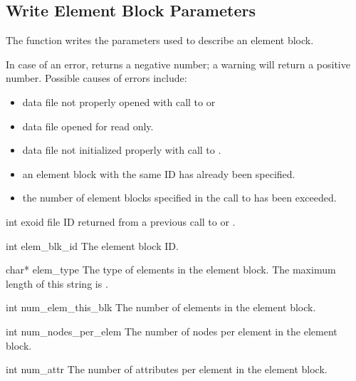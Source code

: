 \subsection{Write Element Block Parameters}\label{s:pebparam}

The function  writes the parameters used
to describe an element block.

In case of an error,  returns a negative
number; a warning will return a positive number. Possible causes of
errors include:

\begin{itemize}
 \item data file not properly opened with call to 
 or 

 \item data file opened for read only.

 \item data file not initialized properly with call to
 .

 \item an element block with the same ID has already been specified.

 \item the number of element blocks specified in the call to
  has been exceeded.
\end{itemize}


\begin{parameters}
\item[{int exoid \R{}}]
\exo{} file ID returned from a previous call to  
or .

\item[{int elem_blk_id \R{}}]
The element block ID.

\item[{char* elem_type \R{}}]
The type of elements in the element block. The maximum length of this
string is .

\item[{int num_elem_this_blk \R{}}]
The number of elements in the element block.

\item[{int num_nodes_per_elem \R{}}]
The number of nodes per element in the element block.

\item[{int num_attr \R{}}]
The number of attributes per element in the element block.
\end{parameters}

